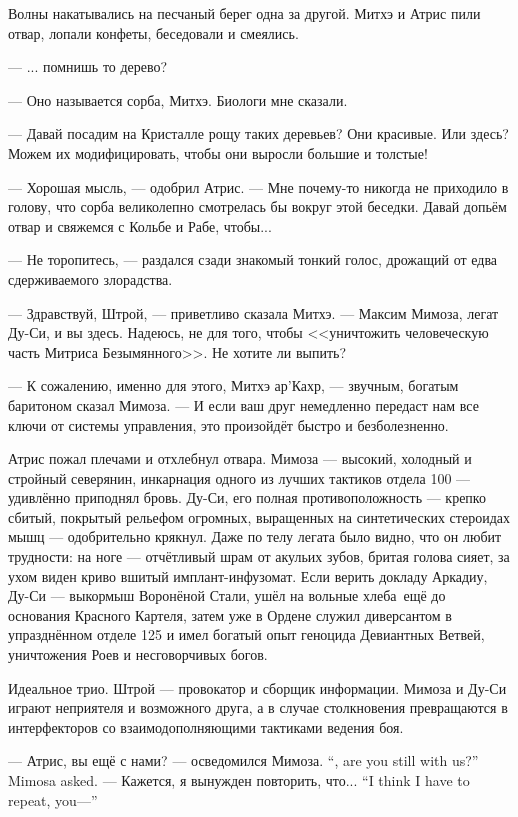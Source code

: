 Волны накатывались на песчаный берег одна за другой.
Митхэ и Атрис пили отвар, лопали конфеты, беседовали и смеялись.

--- ... помнишь то дерево?

--- Оно называется сорба, Митхэ.
Биологи мне сказали.

--- Давай посадим на Кристалле рощу таких деревьев?
Они красивые.
Или здесь?
Можем их модифицировать, чтобы они выросли большие и толстые!

--- Хорошая мысль, --- одобрил Атрис.
--- Мне почему-то никогда не приходило в голову, что сорба великолепно смотрелась бы вокруг этой беседки.
Давай допьём отвар и свяжемся с Кольбе и Рабе, чтобы...

--- Не торопитесь, --- раздался сзади знакомый тонкий голос, дрожащий от едва сдерживаемого злорадства.

--- Здравствуй, Штрой, --- приветливо сказала Митхэ.
--- Максим Мимоза, легат Ду-Си, и вы здесь.
Надеюсь, не для того, чтобы <<уничтожить человеческую часть Митриса Безымянного>>.
Не хотите ли выпить?

--- К сожалению, именно для этого, Митхэ ар’Кахр, --- звучным, богатым баритоном сказал Мимоза.
--- И если ваш друг немедленно передаст нам все ключи от системы управления, это произойдёт быстро и безболезненно.

Атрис пожал плечами и отхлебнул отвара.
Мимоза --- высокий, холодный и стройный северянин, инкарнация одного из лучших тактиков отдела 100 --- удивлённо приподнял бровь.
Ду-Си, его полная противоположность --- крепко сбитый, покрытый рельефом огромных, выращенных на синтетических стероидах мышц --- одобрительно крякнул.
Даже по телу легата было видно, что он любит трудности: на ноге --- отчётливый шрам от акульих зубов, бритая голова сияет, за ухом виден криво вшитый имплант-инфузомат.
Если верить докладу Аркадиу, Ду-Си --- выкормыш Воронёной Стали, ушёл на вольные хлеба\FM\ ещё до основания Красного Картеля, затем уже в Ордене служил диверсантом в упразднённом отделе 125 и имел богатый опыт геноцида Девиантных Ветвей, уничтожения Роев и несговорчивых богов.

Идеальное трио.
Штрой --- провокатор и сборщик информации.
Мимоза и Ду-Си играют неприятеля и возможного друга, а в случае столкновения превращаются в интерфекторов со взаимодополняющими тактиками ведения боя.

{--- Атрис, вы ещё с нами? --- осведомился Мимоза.}
{``\Aatris{}, are you still with us?'' Mimosa asked.}
{--- Кажется, я вынужден повторить, что...}
{``I think I have to repeat, you---''}

